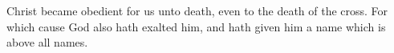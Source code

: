 \begin{Parallel}[v]{\colw}{\colx}
{}
{\vern
{\noindent
Christ became obedient for us unto death, even to the death of the cross. For which cause God also hath exalted him, and hath given him a name which is above all names.}}

\end{Parallel}





